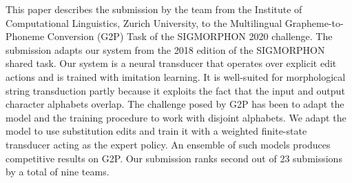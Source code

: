 This paper describes the submission by the team from the Institute of Computational Linguistics, Zurich University, to the Multilingual Grapheme-to-Phoneme Conversion (G2P) Task of the SIGMORPHON 2020 challenge. The submission adapts our system from the 2018 edition of the SIGMORPHON shared task. Our system is a neural transducer that operates over explicit edit actions and is trained with imitation learning. It is well-suited for morphological string transduction partly because it exploits the fact that the input and output character alphabets overlap. The challenge posed by G2P has been to adapt the model and the training procedure to work with disjoint alphabets. We adapt the model to use substitution edits and train it with a weighted finite-state transducer acting as the expert policy. An ensemble of such models produces competitive results on G2P. Our submission ranks second out of 23 submissions by a total of nine teams.
